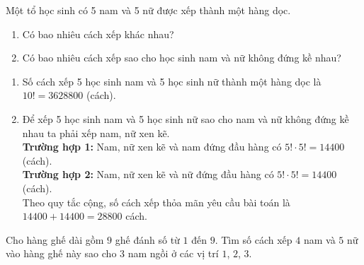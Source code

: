\begin{bt}%
Một tổ học sinh có 5 nam và 5 nữ được xếp thành một hàng dọc.
\begin{enumerate}
\item Có bao nhiêu cách xếp khác nhau?
\item Có bao nhiêu cách xếp sao cho học sinh nam và nữ không đứng kề nhau?
\end{enumerate}
\loigiai
{
\begin{enumerate}
\item Số cách xếp 5 học sinh nam và 5 học sinh nữ thành một hàng dọc là $10!=3628800$ (cách).
\item Để xếp 5 học sinh nam và 5 học sinh nữ sao cho nam và nữ không đứng kề nhau ta phải xếp nam, nữ xen kẽ.\\
\textbf{Trường hợp 1:} Nam, nữ xen kẽ và nam đứng đầu hàng có $5!\cdot5!=14400$ (cách).\\
\textbf{Trường hợp 2:} Nam, nữ xen kẽ và nữ đứng đầu hàng có $5!\cdot5!=14400$ (cách).\\
Theo quy tắc cộng, số cách xếp thỏa mãn yêu cầu bài toán là $14400+14400=28800$ cách.
\end{enumerate}
}
\end{bt}

\begin{bt}%
		Cho hàng ghế dài gồm $9$ ghế đánh số từ $1$ đến $9$. Tìm số cách xếp $4$ nam và $5$ nữ vào hàng ghế này sao cho $3$ nam ngồi ở các vị trí $1$, $2$, $3$.
\end{bt}

